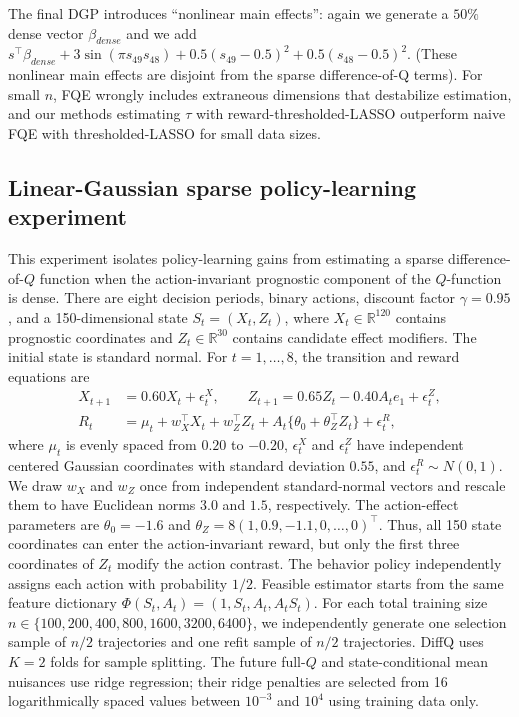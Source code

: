 \documentclass[opre,nonblindrev]{informs4}
\newenvironment{revision}{\begingroup\color{revisionblue}\ignorespaces}{\endgroup}
\begin{document}
The final DGP introduces ``nonlinear main effects'': again we generate a $50\%$ dense vector $\beta_{dense}$ and we add $s^\top \beta_{dense} + 3\sin(\pi s_{49}s_{48} ) +  0.5(s_{49}-0.5)^2 +0.5(s_{48} - 0.5)^2
$. (These nonlinear main effects are  disjoint from the sparse difference-of-Q terms). For small $n$, FQE wrongly includes extraneous dimensions that destabilize estimation, and our methods estimating $\tau$ with reward-thresholded-LASSO outperform naive FQE with thresholded-LASSO for small data sizes. 
\begin{revision}
\subsection{Linear-Gaussian sparse policy-learning experiment}
\label{app:linear-gaussian-policy-details}

This experiment isolates policy-learning gains from estimating a sparse
difference-of-$Q$ function when the action-invariant prognostic component of
the $Q$-function is dense. There are eight decision periods, binary actions,
discount factor $\gamma=0.95$, and a 150-dimensional state
$S_t=(X_t,Z_t)$, where $X_t\in\mathbb R^{120}$ contains prognostic
coordinates and $Z_t\in\mathbb R^{30}$ contains candidate effect modifiers.
The initial state is standard normal. For $t=1,\ldots,8$, the transition and
reward equations are
\begin{align}
 X_{t+1}&=0.60X_t+\epsilon^X_t, \qquad
 Z_{t+1}=0.65Z_t-0.40A_te_1+\epsilon^Z_t,
 \label{eq:linear-policy-transition}\\
 R_t&=\mu_t+w_X^\top X_t+w_Z^\top Z_t
 +A_t\{\theta_0+\theta_Z^\top Z_t\}+\epsilon^R_t,
 \label{eq:linear-policy-reward}
\end{align}
where $\mu_t$ is evenly spaced from $0.20$ to $-0.20$,
$\epsilon^X_t$ and $\epsilon^Z_t$ have independent centered Gaussian
coordinates with standard deviation $0.55$, and
$\epsilon^R_t\sim N(0,1)$. We draw $w_X$ and $w_Z$ once from independent
standard-normal vectors and rescale them to have Euclidean norms $3.0$ and
$1.5$, respectively. The action-effect parameters are
$\theta_0=-1.6$ and
$\theta_Z=8(1,0.9,-1.1,0,\ldots,0)^\top$. Thus, all 150 state coordinates
can enter the action-invariant reward, but only the first three coordinates
of $Z_t$ modify the action contrast. The behavior policy independently
assigns each action with probability $1/2$. Feasible estimator starts from the same feature dictionary $\Phi(S_t,A_t)=(1,S_t,A_t,A_tS_t)$.
For each total training size
$n\in\{100,200,400,800,1600,3200,6400\}$, we independently generate one
selection sample of $n/2$ trajectories and one refit sample of $n/2$
trajectories. DiffQ uses $K=2$ folds for sample splitting. 
The future full-$Q$ and state-conditional mean nuisances use ridge regression;
their ridge penalties are selected from 16 logarithmically spaced values
between $10^{-3}$ and $10^4$ using training data only.


\end{revision}
\end{document}
